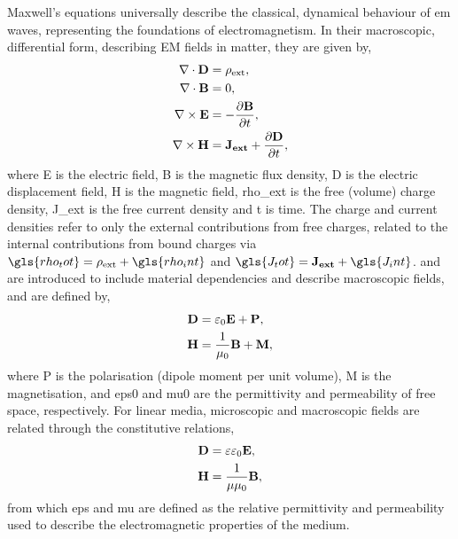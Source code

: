\documentclass{article}
\begin{document}
Maxwell's equations universally describe the classical, dynamical behaviour of \gls{em} waves, representing the foundations of electromagnetism. In their macroscopic, differential form, describing EM fields in matter, they are given by,
\begin{subequations}
\begin{align}
	\nabla \cdot \mathbf{D} &= \rho_{\mathrm{ext}}, \label{eq:maxwell1}\\
	\nabla \cdot \mathbf{B} &= 0, \label{eq:maxwell2}\\
	\nabla \times \mathbf{E} &= -\frac{\partial \mathbf{B}}{\partial t}, \label{eq:maxwell3}\\
	\nabla \times \mathbf{H} &= \mathbf{J_{ext}} + \frac{\partial \mathbf{D}}{\partial t}, \label{eq:maxwell4}
\end{align}
\end{subequations}
where \gls{E} is the electric field, \gls{B} is the magnetic flux density, \gls{D} is the electric displacement field, \gls{H} is the magnetic field, \gls{rho_ext} is the free (volume) charge density, \gls{J_ext} is the free current density and \gls{t} is time. The charge and current densities refer to only the external contributions from free charges, related to the internal contributions from bound charges via $\gls{rho_tot}=\rhoext+\gls{rho_int}$ and $\gls{J_tot}=\Jext+\gls{J_int}$.  and  are introduced to include material dependencies and describe macroscopic fields, and are defined by,
\begin{subequations}
\begin{align}
	\mathbf{D} &= \varepsilon_0\mathbf{E} + \mathbf{P}, \label{eq:displacement_field}\\
	\mathbf{H} &= \frac{1}{\mu_0}\mathbf{B} + \mathbf{M}, \label{eq:magnetic_field}
\end{align}
\end{subequations}
where \gls{P} is the polarisation (dipole moment per unit volume), \gls{M} is the magnetisation, and \gls{eps0} and \gls{mu0} are the permittivity and permeability of free space, respectively. For linear media, microscopic and macroscopic fields are related through the constitutive relations,
\begin{align}
	\mathbf{D} &= \varepsilon\varepsilon_0\mathbf{E}, \label{eq:fourier_displacement_field}\\
	\mathbf{H} &= \frac{1}{\mu\mu_0}\mathbf{B},
\end{align}
from which \gls{eps} and \gls{mu} are defined as the relative permittivity and permeability used to describe the electromagnetic properties of the medium.
\end{document}
